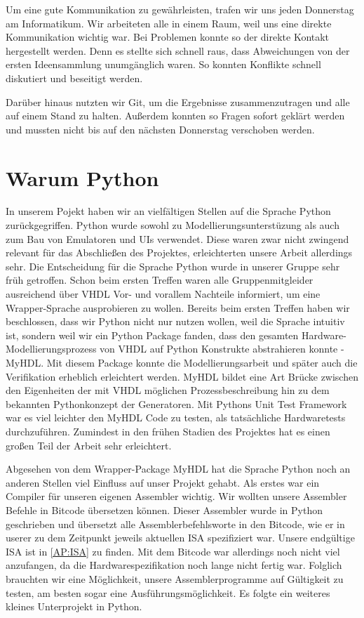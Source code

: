 Um eine gute Kommunikation zu gewährleisten, trafen wir uns jeden Donnerstag am Informatikum. Wir arbeiteten alle in einem Raum, weil uns eine direkte Kommunikation wichtig war. Bei Problemen konnte so der direkte Kontakt hergestellt werden. Denn es stellte sich schnell raus, dass Abweichungen von der ersten Ideensammlung unumgänglich waren. So konnten Konflikte schnell diskutiert und beseitigt werden.

Darüber hinaus nutzten wir Git, um die Ergebnisse zusammenzutragen und alle auf einem Stand zu halten. Außerdem konnten so Fragen sofort geklärt werden und mussten nicht bis auf den nächsten Donnerstag verschoben werden.

\section{Warum Python} %
In unserem Pojekt haben wir an vielfältigen Stellen auf die Sprache Python zurückgegriffen. Python wurde sowohl zu Modellierungsunterstüzung als auch zum Bau von Emulatoren und UIs verwendet. Diese waren zwar nicht zwingend relevant für das Abschließen des Projektes, erleichterten unsere Arbeit allerdings sehr. \newline
Die Entscheidung für die Sprache Python wurde in unserer Gruppe sehr früh getroffen. Schon beim ersten Treffen waren alle Gruppenmitgleider ausreichend über VHDL Vor- und vorallem Nachteile informiert, um eine Wrapper-Sprache ausprobieren zu wollen. Bereits beim ersten Treffen haben wir beschlossen, dass wir Python nicht nur nutzen wollen, weil die Sprache intuitiv ist, sondern weil wir ein Python Package fanden, dass den gesamten Hardware-Modellierungsprozess von VHDL auf Python Konstrukte abstrahieren konnte - MyHDL. Mit diesem Package konnte die Modellierungsarbeit und später auch die Verifikation erheblich erleichtert werden. MyHDL bildet eine Art Brücke zwischen den Eigenheiten der mit VHDL möglichen Prozessbeschreibung hin zu dem bekannten Pythonkonzept der Generatoren. Mit Pythons Unit Test Framework war es viel leichter den MyHDL Code zu testen, als tatsächliche Hardwaretests durchzuführen. Zumindest in den frühen Stadien des Projektes hat es einen großen Teil der Arbeit sehr erleichtert.

Abgesehen von dem Wrapper-Package MyHDL hat die Sprache Python noch an anderen Stellen viel Einfluss auf unser Projekt gehabt. Als erstes war ein Compiler für unseren eigenen Assembler wichtig. Wir wollten unsere Assembler Befehle in Bitcode übersetzen können. Dieser Assembler wurde in Python geschrieben und übersetzt alle Assemblerbefehlsworte in den Bitcode, wie er in userer zu dem Zeitpunkt jeweils aktuellen ISA spezifiziert war. Unsere endgültige ISA ist in \autoref{AP:ISA} zu finden. Mit dem Bitcode war allerdings noch nicht viel anzufangen, da die Hardwarespezifikation noch lange nicht fertig war. Folglich brauchten wir eine Möglichkeit, unsere Assemblerprogramme auf Gültigkeit zu testen, am besten sogar eine Ausführungsmöglichkeit. Es folgte ein weiteres kleines Unterprojekt in Python.

